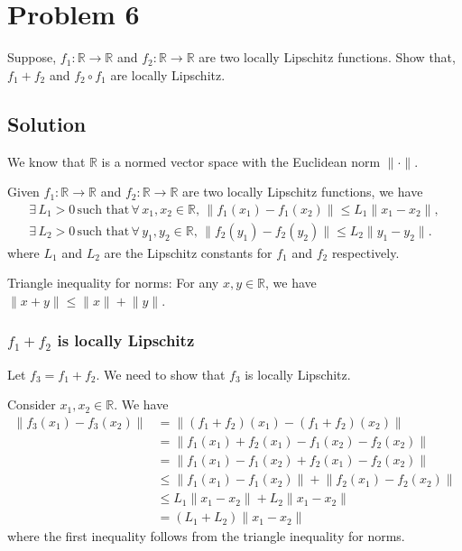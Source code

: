 \section*{Problem 6}

Suppose, \( f_1 : \mathbb{R} \rightarrow \mathbb{R} \) and \( f_2 : \mathbb{R} \rightarrow \mathbb{R} \) are two locally Lipschitz functions.
Show that, \( f_1 + f_2 \) and \( f_2 \circ f_1 \) are locally Lipschitz.

\subsection*{Solution}

We know that \( \mathbb{R} \) is a normed vector space with the Euclidean norm \( \lVert \cdot \rVert \).

Given \( f_1 : \mathbb{R} \rightarrow \mathbb{R} \) and \( f_2 : \mathbb{R} \rightarrow \mathbb{R} \) are two locally Lipschitz functions, we have
\begin{align*}
    \exists \, L_1 > 0 \, \text{such that} \, \forall \, x_1, x_2 \in \mathbb{R}, \, \lVert f_1(x_1) - f_1(x_2) \rVert \leq L_1 \lVert x_1 - x_2 \rVert, \\
    \exists \, L_2 > 0 \, \text{such that} \, \forall \, y_1, y_2 \in \mathbb{R}, \, \lVert f_2(y_1) - f_2(y_2) \rVert \leq L_2 \lVert y_1 - y_2 \rVert .
\end{align*}
where \( L_1 \) and \( L_2 \) are the Lipschitz constants for \( f_1 \) and \( f_2 \) respectively.

\begin{lemma}{Triangle inequality for norms:}
    For any \( x, y \in \mathbb{R} \), we have \( \lVert x + y \rVert \leq \lVert x \rVert + \lVert y \rVert \).
\end{lemma}

\subsubsection*{\( f_1 + f_2 \) is locally Lipschitz}

Let \( f_3 = f_1 + f_2 \).
We need to show that \( f_3 \) is locally Lipschitz.

Consider \( x_1, x_2 \in \mathbb{R} \).
We have
\begin{align*}
    \lVert f_3(x_1) - f_3(x_2) \rVert
     & =
    \lVert (f_1 + f_2)(x_1) - (f_1 + f_2)(x_2) \rVert
    \\ & =
    \lVert f_1(x_1) + f_2(x_1) - f_1(x_2) - f_2(x_2) \rVert
    \\ & =
    \lVert f_1(x_1) - f_1(x_2) + f_2(x_1) - f_2(x_2) \rVert
    \\ & \leq
    \lVert f_1(x_1) - f_1(x_2) \rVert + \lVert f_2(x_1) - f_2(x_2) \rVert
    \\ & \leq
    L_1 \lVert x_1 - x_2 \rVert + L_2 \lVert x_1 - x_2 \rVert
    \\ & = (L_1 + L_2) \lVert x_1 - x_2 \rVert
\end{align*}
where the first inequality follows from the triangle inequality for norms.

